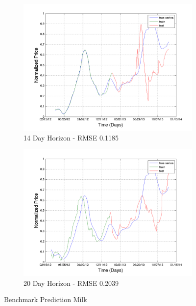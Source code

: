 \begin{figure}
       \hfill
       
        \begin{subfigure}[b]{0.5\textwidth}
                \includegraphics[width=\textwidth]{img/model/milk/pred_14}
                \caption{14 Day Horizon - RMSE 0.1185}
                \label{fig:mouse}
        \end{subfigure}%
         \begin{subfigure}[b]{0.5\textwidth}
                \includegraphics[width=\textwidth]{img/model/milk/pred_20}
                \caption{20 Day Horizon - RMSE 0.2039}
                \label{fig:mouse}
        \end{subfigure}
        \caption{Benchmark Prediction Milk}
        \label{fig:milk_1}
\end{figure}











